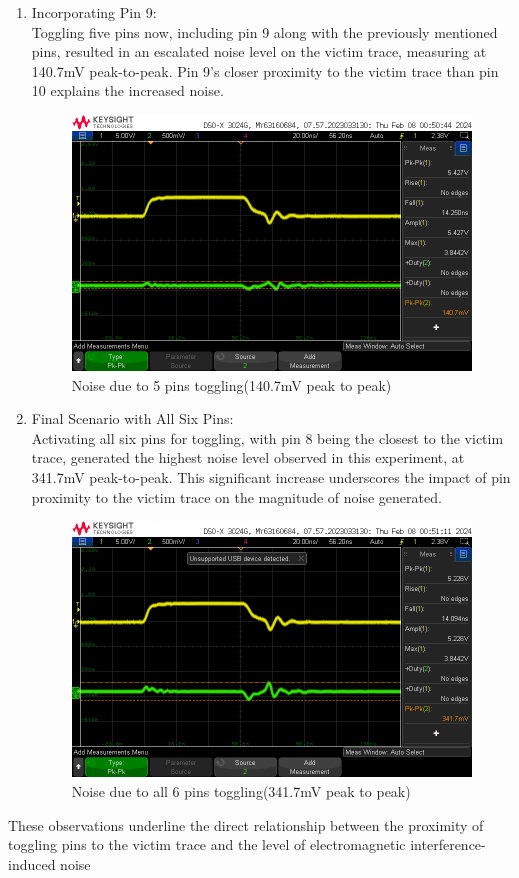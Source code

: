 \documentclass[a4paper,11pt]{article}%
\begin{document}
\begin{enumerate}
	\item Incorporating Pin 9:\\ Toggling five pins now, including pin 9 along with the previously mentioned pins, resulted in an escalated noise level on the victim trace, measuring at 140.7mV peak-to-peak. Pin 9's closer proximity to the victim trace than pin 10 explains the increased noise.
	\begin{figure}[H]
		\centering
		\includegraphics[scale=0.5]{figures/noise_plane_5.png}
		\caption{Noise due to 5 pins toggling(140.7mV peak to peak)}
		\label{noise_plane_5}
	\end{figure}
	
	\item Final Scenario with All Six Pins:\\ Activating all six pins for toggling, with pin 8 being the closest to the victim trace, generated the highest noise level observed in this experiment, at 341.7mV peak-to-peak. This significant increase underscores the impact of pin proximity to the victim trace on the magnitude of noise generated.
	\begin{figure}[H]
		\centering
		\includegraphics[scale=0.5]{figures/noise_plane_6.png}
		\caption{Noise due to all 6 pins toggling(341.7mV peak to peak)}
		\label{noise_plane_6}
	\end{figure}
	
\end{enumerate}
These observations underline the direct relationship between the proximity of toggling pins to the victim trace and the level of electromagnetic interference-induced noise
\end{document}
